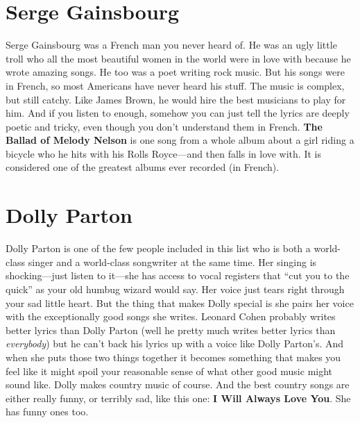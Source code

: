 \documentclass[letterpaper,single]{article}
\begin{document}
\section{Serge Gainsbourg}
Serge Gainsbourg was a French man you never heard of. He was an ugly
little troll who all the most beautiful women in the world were in love
with because he wrote amazing songs. He too was a poet writing rock
music. But his songs were in French, so most Americans have never heard
his stuff. The music is complex, but still catchy. Like James Brown,
he would hire the best musicians to play for him. And if you listen
to enough, somehow you can just tell the lyrics are deeply poetic and
tricky, even though you don't understand them in French. \textbf{The
Ballad of Melody Nelson} is one song from a whole album about a girl
riding a bicycle who he hits with his Rolls Royce---and then falls in
love with. It is considered one of the greatest albums ever recorded (in
French).

\section{Dolly Parton}
Dolly Parton is one of the few people included in this list who is
both a world-class singer and a world-class songwriter at the same
time. Her singing is shocking---just listen to it---she has access
to vocal registers that ``cut you to the quick'' as your old humbug
wizard would say. Her voice just tears right through your sad little
heart. But the thing that makes Dolly special is she pairs her voice
with the exceptionally good songs she writes. Leonard Cohen probably
writes better lyrics than Dolly Parton (well he pretty much writes
better lyrics than \emph{everybody}) but he can't back his lyrics up
with a voice like Dolly Parton's. And when she puts those two things
together it becomes something that makes you feel like it might spoil
your reasonable sense of what other good music might sound like. Dolly
makes country music of course. And the best country songs are either
really funny, or terribly sad, like this one: \textbf{I Will Always Love
You}. She has funny ones too.
\end{document}
